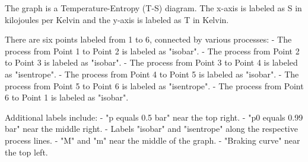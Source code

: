 The graph is a Temperature-Entropy (T-S) diagram. The x-axis is labeled as S in kilojoules per Kelvin and the y-axis is labeled as T in Kelvin.

There are six points labeled from 1 to 6, connected by various processes:
- The process from Point 1 to Point 2 is labeled as "isobar".
- The process from Point 2 to Point 3 is labeled as "isobar".
- The process from Point 3 to Point 4 is labeled as "isentrope".
- The process from Point 4 to Point 5 is labeled as "isobar".
- The process from Point 5 to Point 6 is labeled as "isentrope".
- The process from Point 6 to Point 1 is labeled as "isobar".

Additional labels include:
- "p equals 0.5 bar" near the top right.
- "p0 equals 0.99 bar" near the middle right.
- Labels "isobar" and "isentrope" along the respective process lines.
- "M" and "m" near the middle of the graph.
- "Braking curve" near the top left.